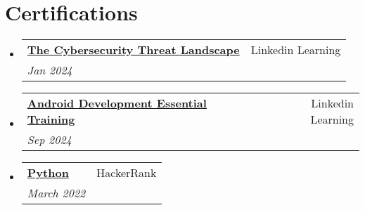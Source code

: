 \documentclass[letterpaper,11pt]{article}
\makeatletter
\newcommand{\resumeSubheading}[4]{
  \vspace{-2pt}\item
    \begin{tabular*}{0.97\textwidth}[t]{l@{\extracolsep{\fill}}r}
      \textbf{#1} & #2 \\
      \textit{\small#3} & \textit{\small #4} \\
    \end{tabular*}\vspace{-7pt}
}
\newcommand{\resumeSubHeadingListStart}{\begin{itemize}[leftmargin=0.15in, label={}]}
\newcommand{\resumeSubHeadingListEnd}{\end{itemize}}
\makeatother
\begin{document}
\section{Certifications}
  \resumeSubHeadingListStart
  \resumeSubheading
      {\href{https://www.hackerrank.com/certificates/dd8f41e196fa} {The Cybersecurity Threat Landscape}}{Linkedin Learning}{Jan 2024}{}
    \resumeSubheading
{\href{https://www.linkedin.com/learning/certificates/f1ad0fee7918badf79380b7ca9f8150092891eb43e30236ca0efa3602884c9bd?u=229219690}{Android Development Essential Training}}
      {Linkedin Learning}{Sep 2024}{}
      \resumeSubheading
      {\href{https://www.hackerrank.com/certificates/dd8f41e196fa} {Python}}{HackerRank}{March 2022}{}
  \resumeSubHeadingListEnd

\end{document}
